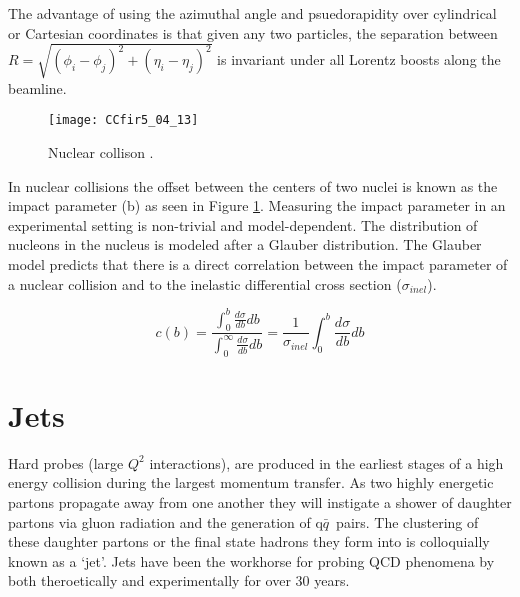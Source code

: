 \noindent
The advantage of using the azimuthal angle and psuedorapidity over cylindrical or Cartesian coordinates is that given any two particles, the separation between $R = \sqrt{ (\phi_{i} - \phi_{j})^{2} + (\eta_{i} - \eta_{j})^{2}  } $ is invariant under all Lorentz boosts along the beamline.


\begin{figure}[h]
\texttt{[image: CCfir5\_04\_13]}
\centering
\caption{Nuclear collison  .}
\label{fig:centrality}
\end{figure}

\noindent
In nuclear collisions the offset between the centers of two nuclei is known as the impact parameter (b) as seen in Figure \ref{fig:centrality}.  Measuring the impact parameter in an experimental setting is non-trivial and model-dependent.  The distribution of nucleons in the nucleus is modeled after a Glauber distribution\cite{Loizides:2016djv}.  The Glauber model predicts that there is a direct correlation between the impact parameter of a nuclear collision and to the inelastic differential cross section ($\sigma_{inel}$)\cite{Miller:2007ri}.


\begin{equation}
c(b) =\frac{ \int_{0}^{b} \frac{d \sigma}{db} db}{ \int_{0}^{\infty} \frac{d \sigma}{db} db} = \frac{1}{\sigma_{inel}} \int_{0}^{b} \frac{d \sigma}{db} db
\label{eq:centrality}
\end{equation}




\section{Jets}

Hard probes (large $Q^{2}$ interactions), are produced in the earliest stages of a high energy collision during the largest momentum transfer.  As two highly energetic partons propagate away from one another they will instigate a shower of daughter partons via gluon radiation and the generation of q$\bar{q}$\, pairs.  The clustering of these daughter partons or the final state hadrons they form into is colloquially known as a `jet'.   Jets have been the workhorse for probing QCD phenomena by both theroetically and experimentally for over 30 years.  

